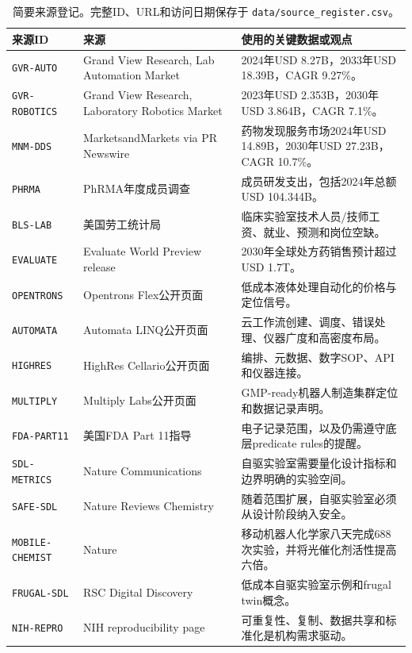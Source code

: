 \documentclass[11pt,fontset=none]{ctexart}
\begin{document}
\begin{table}[H]
\centering
\scriptsize
\begin{tabularx}{\linewidth}{@{}L{3.2cm}L{3.8cm}Y@{}}
\toprule
\textbf{来源ID} & \textbf{来源} & \textbf{使用的关键数据或观点} \\
\midrule
\texttt{GVR-AUTO} & Grand View Research, Lab Automation Market & 2024年USD 8.27B，2033年USD 18.39B，CAGR 9.27\%。 \\
\texttt{GVR-ROBOTICS} & Grand View Research, Laboratory Robotics Market & 2023年USD 2.353B，2030年USD 3.864B，CAGR 7.1\%。 \\
\texttt{MNM-DDS} & MarketsandMarkets via PR Newswire & 药物发现服务市场2024年USD 14.89B，2030年USD 27.23B，CAGR 10.7\%。 \\
\texttt{PHRMA} & PhRMA年度成员调查 & 成员研发支出，包括2024年总额USD 104.344B。 \\
\texttt{BLS-LAB} & 美国劳工统计局 & 临床实验室技术人员/技师工资、就业、预测和岗位空缺。 \\
\texttt{EVALUATE} & Evaluate World Preview release & 2030年全球处方药销售预计超过USD 1.7T。 \\
\texttt{OPENTRONS} & Opentrons Flex公开页面 & 低成本液体处理自动化的价格与定位信号。 \\
\texttt{AUTOMATA} & Automata LINQ公开页面 & 云工作流创建、调度、错误处理、仪器广度和高密度布局。 \\
\texttt{HIGHRES} & HighRes Cellario公开页面 & 编排、元数据、数字SOP、API和仪器连接。 \\
\texttt{MULTIPLY} & Multiply Labs公开页面 & GMP-ready机器人制造集群定位和数据记录声明。 \\
\texttt{FDA-PART11} & 美国FDA Part 11指导 & 电子记录范围，以及仍需遵守底层predicate rules的提醒。 \\
\texttt{SDL-METRICS} & Nature Communications & 自驱实验室需要量化设计指标和边界明确的实验空间。 \\
\texttt{SAFE-SDL} & Nature Reviews Chemistry & 随着范围扩展，自驱实验室必须从设计阶段纳入安全。 \\
\texttt{MOBILE-CHEMIST} & Nature & 移动机器人化学家八天完成688次实验，并将光催化剂活性提高六倍。 \\
\texttt{FRUGAL-SDL} & RSC Digital Discovery & 低成本自驱实验室示例和frugal twin概念。 \\
\texttt{NIH-REPRO} & NIH reproducibility page & 可重复性、复制、数据共享和标准化是机构需求驱动。 \\
\bottomrule
\end{tabularx}
\caption{简要来源登记。完整ID、URL和访问日期保存于 \texttt{data/source\_register.csv}。}
\label{tab:sources-cn}
\end{table}
\end{document}
